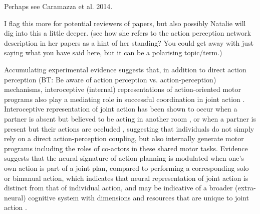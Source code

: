 Perhaps see Caramazza et al. 2014.

I flag this more for potential reviewers of papers, but also possibly Natalie will dig into this a little deeper. (see how she refers to the action perception network description in her papers as a hint of her standing? You could get away with just saying what you have said here, but it can be a polarising topic/term.)

Accumulating experimental evidence suggests that, in addition to direct action perception (BT: Be aware of action perception vs. action-perception) mechanisms, interoceptive (internal) representations of action-oriented motor programs also play a mediating role in successful coordination in joint action \citep{Moreau2016}.  Interoceptive representation of joint action has been shown to occur when a partner is absent but believed to be acting in another room \citep{Milward2014}, or when a partner is present but their actions are occluded \citep{Atmaca2011}, suggesting that individuals do not simply rely on a direct action-perception coupling, but also internally generate motor programs including the roles of co-actors in these shared motor tasks.
Evidence suggests that the neural signature of action planning is modulated when one's own action is part of a joint plan, compared to performing a corresponding solo or bimanual action, which indicates that neural representation of joint action is distinct from that of individual action, and may be indicative of a broader (extra-neural) cognitive system with dimensions and resources that are unique to joint action \citep{Kourtis2014}.


